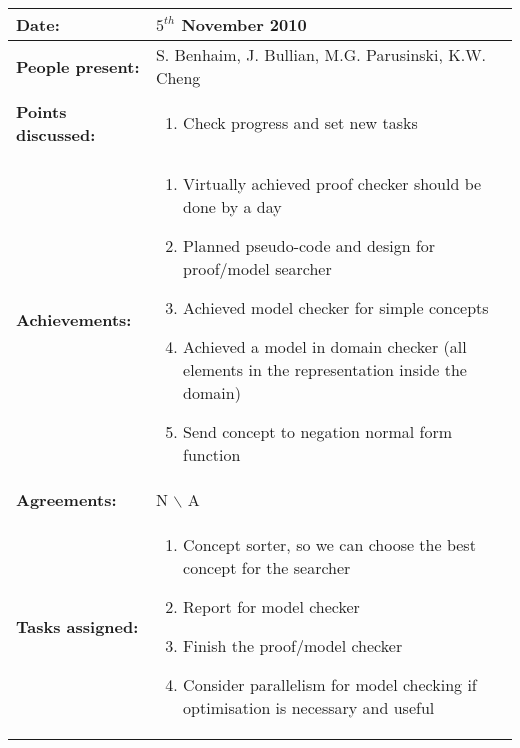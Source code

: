 \documentclass[12pt,a4paper]{article}
\newcommand{\meeting}[6]{%
\begin{center}%
\begin{longtable}{| p{3.5cm}  | p{13cm} |}%
\hline%
\textbf{Date:} & #1 \\%
\hline%
\textbf{People present:} &#2 \\%
\hline%
\textbf{Points discussed:} &#3\\%
\hline%
\textbf{Achievements:} &#4 \\%
\hline%
\textbf{Agreements:} &#5 \\%
\hline%
\textbf{Tasks assigned:} &#6  \\%
\hline%
\end{longtable}%
\end{center}%
\bigbreak
}
\begin{document}
\meeting{$5^{th}$ November 2010}%
{S. Benhaim, J. Bullian, M.G. Parusinski, K.W. Cheng}%
{\begin{enumerate} 
\item  Check progress and set new tasks
\end{enumerate} }%
{\begin{enumerate}
\item Virtually achieved proof checker should be done by a day
\item Planned pseudo-code and design for proof/model searcher
\item Achieved model checker for simple concepts
\item Achieved a model in domain checker (all elements in the representation inside the domain)
\item Send concept to negation normal form function
\end{enumerate}}%
{N $\backslash$ A}
{\begin{enumerate}
\item Concept sorter, so we can choose the best concept for the searcher
\item Report for model checker
\item Finish the proof/model checker
\item Consider parallelism for model checking if optimisation is necessary and useful
\end{enumerate}}%
\end{document}
